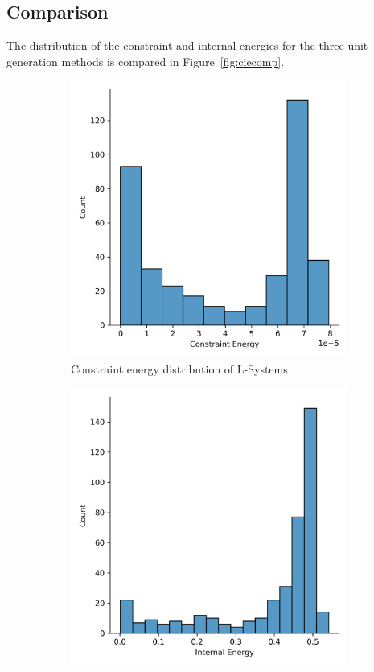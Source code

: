 \subsection{Comparison}

The distribution of the constraint and internal energies for the three unit generation methods is compared in Figure~\ref{fig:ciecomp}.

\begin{figure}[H]
	\centering
	\begin{subfigure}[c]{0.45\textwidth}
		\centering
		\includegraphics[width=\textwidth]{ce_ls.png}
		\caption{Constraint energy distribution of L-Systems}
	\end{subfigure}
	\hfill
	\begin{subfigure}[c]{0.45\textwidth}
		\centering
		\includegraphics[width=\textwidth]{ie_ls.png}

\end{subfigure}
\end{figure}

